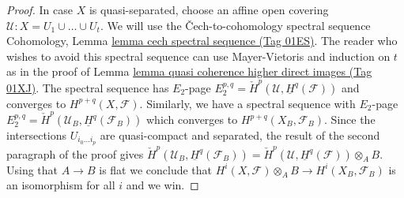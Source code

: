 \documentclass{amsart}
\theoremstyle{plain}
\theoremstyle{definition}
\theoremstyle{remark}
\numberwithin{equation}{subsection}
\begin{document}
\begin{proof}
\medskip\noindent
In case $X$ is quasi-separated, choose an affine open covering
$\mathcal{U} : X = U_1 \cup \ldots \cup U_t$. We will use the
{\v C}ech-to-cohomology spectral sequence
Cohomology, Lemma \href{https://stacks.math.columbia.edu/tag/01ES}{lemma cech spectral sequence (Tag 01ES)}.
The reader who wishes to avoid this spectral sequence
can use Mayer-Vietoris and induction on $t$ as in the proof of
Lemma \href{https://stacks.math.columbia.edu/tag/01XJ}{lemma quasi coherence higher direct images (Tag 01XJ)}.
The spectral sequence has $E_2$-page
$E_2^{p, q} = \check{H}^p(\mathcal{U}, \underline{H}^q(\mathcal{F}))$
and converges to $H^{p + q}(X, \mathcal{F})$.
Similarly, we have a spectral sequence with $E_2$-page
$E_2^{p, q} = \check{H}^p(\mathcal{U}_B, \underline{H}^q(\mathcal{F}_B))$
which converges to $H^{p + q}(X_B, \mathcal{F}_B)$.
Since the intersections $U_{i_0 \ldots i_p}$ are quasi-compact
and separated, the result of the second paragraph of the proof gives
$\check{H}^p(\mathcal{U}_B, \underline{H}^q(\mathcal{F}_B)) =
\check{H}^p(\mathcal{U}, \underline{H}^q(\mathcal{F})) \otimes_A B$.
Using that $A \to B$ is flat we conclude that
$H^i(X, \mathcal{F}) \otimes_A B \to H^i(X_B, \mathcal{F}_B)$
is an isomorphism for all $i$ and we win.
\end{proof}
\end{document}
